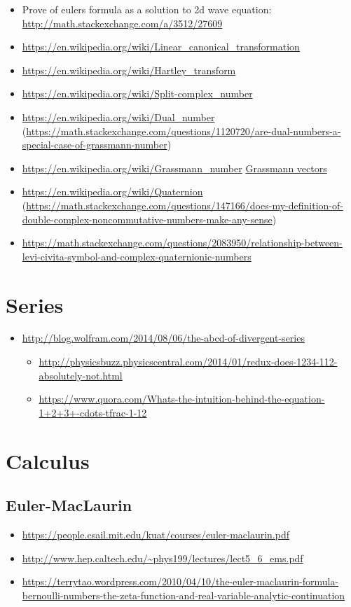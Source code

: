 \begin{itemize}
\item Prove of eulers formula as a solution to 2d wave equation: \url{http://math.stackexchange.com/a/3512/27609}
\item \url{https://en.wikipedia.org/wiki/Linear_canonical_transformation}
\item \url{https://en.wikipedia.org/wiki/Hartley_transform}
\item \url{https://en.wikipedia.org/wiki/Split-complex_number}
\item \url{https://en.wikipedia.org/wiki/Dual_number} (\url{https://math.stackexchange.com/questions/1120720/are-dual-numbers-a-special-case-of-grassmann-number})
\item \url{https://en.wikipedia.org/wiki/Grassmann_number} \href{https://math.stackexchange.com/questions/1108045/relationship-between-levi-civita-symbol-and-grassmann-numbers}{Grassmann vectors}
\item \url{https://en.wikipedia.org/wiki/Quaternion} (\url{https://math.stackexchange.com/questions/147166/does-my-definition-of-double-complex-noncommutative-numbers-make-any-sense})
\item \url{https://math.stackexchange.com/questions/2083950/relationship-between-levi-civita-symbol-and-complex-quaternionic-numbers}
\end{itemize}
\section{Series}

\begin{itemize}
\item \url{http://blog.wolfram.com/2014/08/06/the-abcd-of-divergent-series}
\begin{itemize}
\item \url{http://physicsbuzz.physicscentral.com/2014/01/redux-does-1234-112-absolutely-not.html}
\item \url{https://www.quora.com/Whats-the-intuition-behind-the-equation-1+2+3+-cdots-tfrac-1-12}
\end{itemize}
\end{itemize}

\section{Calculus}

\subsection{Euler-MacLaurin}
\begin{itemize}
\item \url{https://people.csail.mit.edu/kuat/courses/euler-maclaurin.pdf}
\item \url{http://www.hep.caltech.edu/~phys199/lectures/lect5_6_ems.pdf}
\item \url{https://terrytao.wordpress.com/2010/04/10/the-euler-maclaurin-formula-bernoulli-numbers-the-zeta-function-and-real-variable-analytic-continuation}
\end{itemize}

